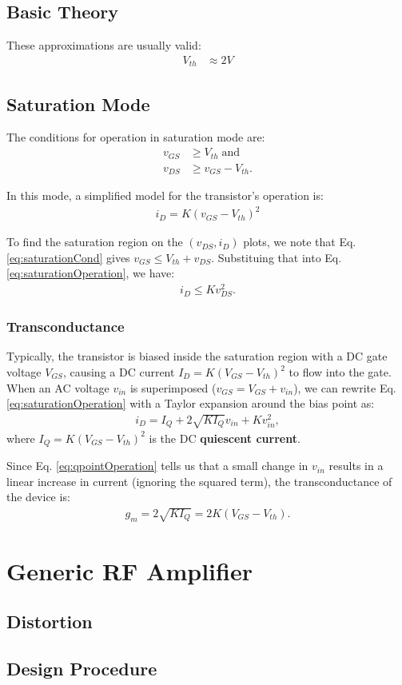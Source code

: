 \documentclass[letterpaper,10pt]{report}
\begin{document}
\section{Basic Theory}

These approximations are usually valid:
\begin{align}
 V_{th} &\approx 2V
\end{align}

\section{Saturation Mode}

The conditions for operation in saturation mode are:
\begin{align}
 v_{GS} &\geq V_{th} \; \text{and}\\
 v_{DS} &\geq v_{GS} - V_{th}. \label{eq:saturationCond}
\end{align}

In this mode, a simplified model for the transistor's operation is:
\begin{align}
 i_D = K(v_{GS}-V_{th})^2 \label{eq:saturationOperation}
\end{align}

To find the saturation region on the $(v_{DS},i_D)$
plots, we note that Eq. \eqref{eq:saturationCond} gives
$v_{GS} \leq V_{th}+v_{DS}$. Substituing that into Eq. \eqref{eq:saturationOperation},
we have:
\begin{align}
 i_D \leq Kv_{DS}^2.
\end{align}

\subsection{Transconductance}

Typically, the transistor is biased inside the saturation region with a DC
gate voltage $V_{GS}$, causing a DC current $I_D=K(V_{GS}-V_{th})^2$ to flow
into the gate. When an AC voltage $v_{in}$ is superimposed
($v_{GS}=V_{GS}+v_{in}$), we can rewrite Eq. \eqref{eq:saturationOperation}
with a Taylor expansion around the bias point as:
\begin{align}
 i_D = I_Q + 2\sqrt{KI_Q} v_{in} + K v_{in}^2, \label{eq:qpointOperation}
\end{align}
where $I_Q=K(V_{GS}-V_{th})^2$ is the DC \textbf{quiescent current}.

Since Eq. \eqref{eq:qpointOperation} tells us that a small change in $v_{in}$
results in a linear increase in current (ignoring the squared term), the
transconductance of the device is:
\begin{align}
 g_m = 2\sqrt{KI_Q} = 2K(V_{GS}-V_{th}).
\end{align}


\chapter{Generic RF Amplifier}%

\section{Distortion}

\section{Design Procedure}
\end{document}
